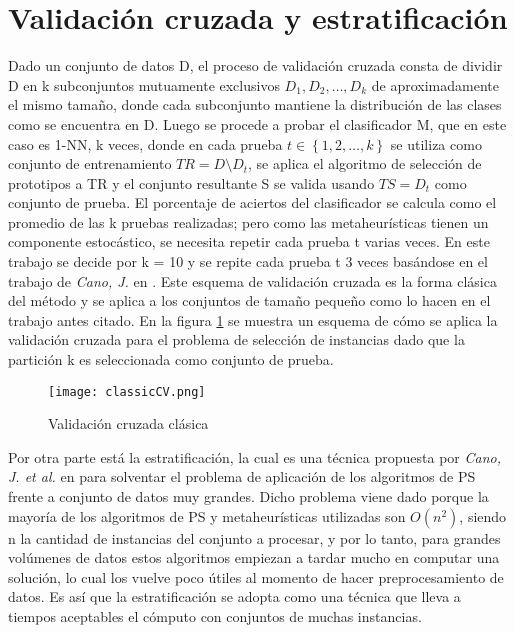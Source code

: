 \section{Validación cruzada y estratificación}

Dado un conjunto de datos D, el proceso de validación cruzada \cite{kohavi1995study} consta de dividir D en k subconjuntos mutuamente exclusivos $D_1,D_2,\dots,D_k$ de aproximadamente el mismo tamaño, donde cada subconjunto mantiene la distribución de las clases como se encuentra en D. Luego se procede a probar el clasificador M, que en este caso es 1-NN, k veces, donde en cada prueba $t \in \left\{1,2,\dots,k\right\}$ se utiliza como conjunto de entrenamiento $TR=D \setminus D_t$, se aplica el algoritmo de selección de prototipos a TR y el conjunto resultante S se valida usando $TS=D_t$ como conjunto de prueba. El porcentaje de aciertos del clasificador se calcula como el promedio de las k pruebas realizadas; pero como las metaheurísticas tienen un componente estocástico, se necesita repetir cada prueba t varias veces. En este trabajo se decide por k = 10 y se repite cada prueba t 3 veces basándose en el trabajo de \emph{Cano, J.} en \cite{de2004reduccion}. Este esquema de validación cruzada es la forma clásica del método y se aplica a los conjuntos de tamaño pequeño como lo hacen en el trabajo antes citado. En la figura \ref{crossval} se muestra un esquema de cómo se aplica la validación cruzada para el problema de selección de instancias dado que la partición k es seleccionada como conjunto de prueba.

\begin{figure}[]
\centering
\texttt{[image: classicCV.png]}
\caption[Classic]{Validación cruzada clásica}
\label{crossval}
\end{figure}

Por otra parte está la estratificación, la cual es una técnica propuesta por \emph{Cano, J. et al.} en \cite{cano2005stratification} para solventar el problema de aplicación de los algoritmos de PS frente a conjunto de datos muy grandes. Dicho problema viene dado porque la mayoría de los algoritmos de PS y metaheurísticas utilizadas son $O(n^2)$, siendo n la cantidad de instancias del conjunto a procesar, y por lo tanto, para grandes volúmenes de datos estos algoritmos empiezan a tardar mucho en computar una solución, lo cual los vuelve poco útiles al momento de hacer preprocesamiento de datos. Es así que la estratificación se adopta como una técnica que lleva a tiempos aceptables el cómputo con conjuntos de muchas instancias. 

